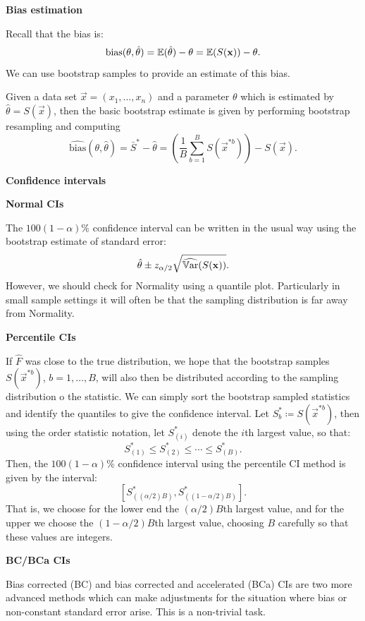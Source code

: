 \documentclass[10pt, a4paper]{article}
\begin{document}
\textbf{Bias estimation}

Recall that the bias is:
\[
\mathrm{bias}(\theta, \hat{\theta}) = \mathbb{E}(\hat{\theta}) - \theta = \mathbb{E}(S(\mathbf{x})) - \theta.
\]
We can use bootstrap samples to provide an estimate of this bias.

\begin{definition}
    Given a data set $\vec{x} = (x_1, \dotsc, x_n)$ and a parameter $\theta$ which is estimated by $\hat{\theta} = S(\vec{x})$,
    then the basic bootstrap estimate is given by performing bootstrap resampling and computing
    \[
    \widehat{\mathrm{bias}}(\theta, \hat{\theta}) = \bar{S} ^ {*} - \hat{\theta} = \left(\frac{1}{B}\sum_{b = 1}^{B}S(\vec{x} ^ {*b})\right) - S(\vec{x}).
    \]
\end{definition}

\textbf{Confidence intervals}

\textbf{Normal CIs}

The $100(1 - \alpha)\%$ confidence interval can be written in the usual way using the bootstrap estimate of standard error:
\[
\hat{\theta} \pm z_{\alpha / 2}\sqrt{\widehat{\mathbb{V}\mathrm{ar}}(S(\mathbf{x}))}.
\]
However,
we should check for Normality using a quantile plot.
Particularly in small sample settings it will often be that the sampling distribution is far away from Normality. 



\textbf{Percentile CIs}

If $\hat{F}$ was close to the true distribution,
we hope that the bootstrap samples $S(\vec{x} ^ {*b})$,
$b = 1, \dotsc, B$,
will also then be distributed according to the sampling distribution o the statistic.
We can simply sort the bootstrap sampled statistics and identify the quantiles to give the confidence interval.
Let $S_{b}^{*} \coloneqq S(\vec{x} ^ {*b})$,
then using the order statistic notation,
let $S_{(i)}^{*}$ denote the $i$th largest value,
so that:
\[
S_{(1)}^{*} \leq S_{(2)}^{*} \leq \dotsi \leq S_{(B)}^{*}.
\]
Then,
the $100(1 - \alpha)\%$ confidence interval using the percentile CI method is given by the interval:
\[
\left[S_{((\alpha / 2)B)}^{*}, S_{((1 - \alpha / 2)B)}^{*}\right].
\]
That is,
we choose for the lower end the $(\alpha / 2)B$th largest value,
and for the upper we choose the $(1 - \alpha / 2)B$th largest value,
choosing $B$ carefully so that these values are integers.

\textbf{BC/BCa CIs}

Bias corrected
(BC)
and bias corrected and accelerated
(BCa)
CIs are two more advanced methods which can make adjustments for the situation where bias or non-constant standard error arise.
This is a non-trivial task.
\end{document}
